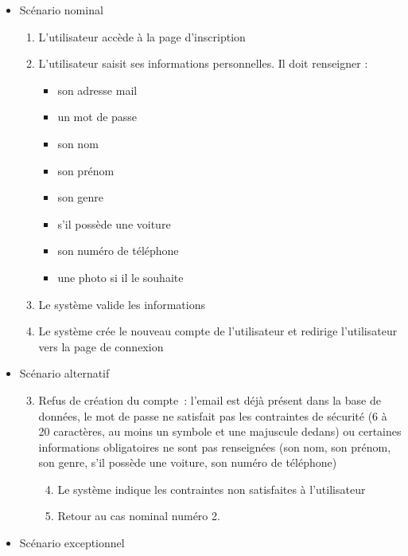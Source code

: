\begin{itemize}
    \begin{itemize}
        \item Scénario nominal
        \begin{enumerate}
            \item L'utilisateur accède à la page d'inscription
            \item L'utilisateur saisit ses informations personnelles. Il doit renseigner :
            \begin{itemize}
                \item son adresse mail
                \item un mot de passe
                \item son nom
                \item son prénom
                \item son genre
                \item s'il possède une voiture
                \item son numéro de téléphone
                \item une photo si il le souhaite
            \end{itemize}
            \item Le système valide les informations
            \item Le système crée le nouveau compte de l'utilisateur et redirige l'utilisateur vers la page de connexion
        \end{enumerate}
        \item Scénario alternatif
            \begin{enumerate}[{1{a}.}]\setcounter{enumi}{2}
                \item Refus de création du compte~: l'email est déjà présent dans la base de données, le mot de passe ne satisfait pas les contraintes de sécurité (6 à 20 caractères, au moins un symbole et une majuscule dedans) ou certaines informations obligatoires ne sont pas renseignées (son nom, son prénom, son genre, s'il possède une voiture, son numéro de téléphone)
                    \begin{enumerate}[{1.}]\setcounter{enumii}{3}
                        \item Le système indique les contraintes non satisfaites à l'utilisateur
                        \item Retour au cas nominal numéro 2. 
                    \end{enumerate}
            \end{enumerate}
        \item Scénario exceptionnel
    \end{itemize}


\end{itemize}
